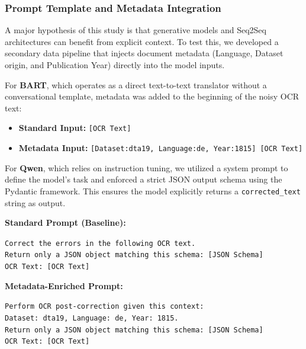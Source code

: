 \documentclass[11pt]{extarticle}
\begin{document}
\subsubsection{Prompt Template and Metadata Integration}
A major hypothesis of this study is that generative models and Seq2Seq architectures can benefit from explicit context. To test this, we developed a secondary data pipeline that injects document metadata (Language, Dataset origin, and Publication Year) directly into the model inputs.

For \textbf{BART}, which operates as a direct text-to-text translator without a conversational template, metadata was added to the beginning of the noisy OCR text:
\begin{itemize}
    \item \textbf{Standard Input:} \texttt{[OCR Text]}
    \item \textbf{Metadata Input:} \texttt{[Dataset:dta19, Language:de, Year:1815] [OCR Text]}
\end{itemize}

For \textbf{Qwen}, which relies on instruction tuning, we utilized a system prompt to define the model's task and enforced a strict JSON output schema using the Pydantic framework. This ensures the model explicitly returns a \texttt{corrected\_text} string as output.

\vspace{0.5em}
\noindent\textbf{Standard Prompt (Baseline):}
\begin{mdframed}[backgroundcolor=gray!10, linewidth=0pt, innertopmargin=10pt, innerbottommargin=10pt, innerleftmargin=10pt]
\small\texttt{Correct the errors in the following OCR text.}\\
\texttt{Return only a JSON object matching this schema: [JSON Schema]}\\
\texttt{OCR Text: [OCR Text]}
\end{mdframed}

\noindent\textbf{Metadata-Enriched Prompt:}
\begin{mdframed}[backgroundcolor=gray!10, linewidth=0pt, innertopmargin=10pt, innerbottommargin=10pt, innerleftmargin=10pt]
\small\texttt{Perform OCR post-correction given this context:\\
Dataset: dta19, Language: de, Year: 1815.}\\
\texttt{Return only a JSON object matching this schema: [JSON Schema]}\\
\texttt{OCR Text: [OCR Text]}
\end{mdframed}
\vspace{0.5em}
\end{document}
